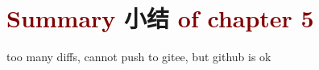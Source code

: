 \section{\textcolor{Maroon}{Summary} 小结 \textcolor{Maroon}{of chapter 5}}\label{sec:summary-chapter5}

\cite{dregerSecondharmonicGenerationNonlinear1990,zubairyAnalyticApproachSecondharmonic1985}

too many diffs, cannot push to gitee, but github is ok

\cite{katoSecondharmonicGeneration20481986,katoTemperaturetuned90Phasematching1994,brunerTemperaturedependentSellmeierEquation2003,jundtTemperaturedependentSellmeierEquation1997,katoSellmeierThermoopticDispersion2002}

